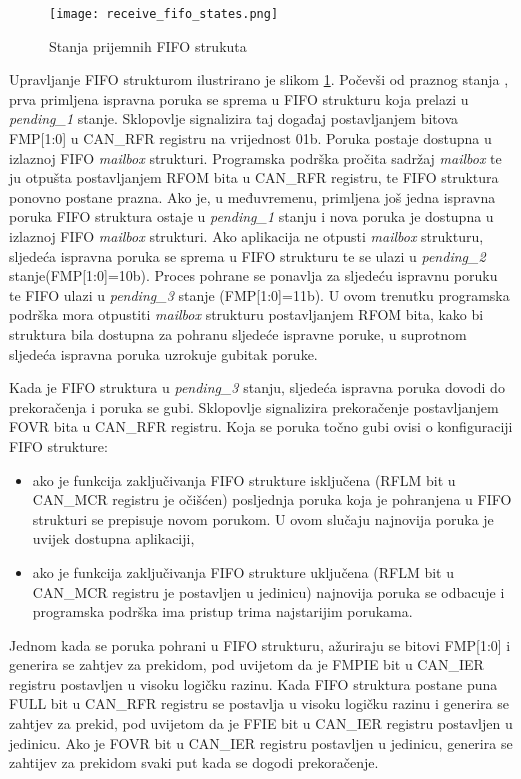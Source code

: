 \begin{figure}[H]
	\centering
	\texttt{[image: receive\_fifo\_states.png]}
	\caption{Stanja prijemnih FIFO strukuta \cite{l471_manual}}
	\label{fig:receive_fifo_states}
\end{figure}
Upravljanje FIFO strukturom ilustrirano je slikom \ref{fig:receive_fifo_states}. Počevši od praznog stanja , prva primljena ispravna poruka se sprema u FIFO strukturu koja prelazi u \textit{pending\_1} stanje. Sklopovlje signalizira taj događaj postavljanjem bitova FMP[1:0] u CAN\_RFR registru na vrijednost 01b. Poruka postaje dostupna u izlaznoj FIFO \textit{mailbox} strukturi. Programska podrška pročita sadržaj \textit{mailbox} te ju otpušta postavljanjem RFOM bita u CAN\_RFR registru, te FIFO struktura ponovno postane prazna. Ako je, u međuvremenu, primljena još jedna ispravna poruka FIFO struktura ostaje u \textit{pending\_1} stanju i nova poruka je dostupna u izlaznoj FIFO \textit{mailbox} strukturi. Ako aplikacija ne otpusti \textit{mailbox} strukturu, sljedeća ispravna poruka se sprema u FIFO strukturu te se ulazi u \textit{pending\_2} stanje(FMP[1:0]=10b). Proces pohrane se ponavlja za sljedeću ispravnu poruku te FIFO ulazi u \textit{pending\_3} stanje (FMP[1:0]=11b). U ovom trenutku programska podrška mora otpustiti \textit{mailbox} strukturu postavljanjem RFOM bita, kako bi struktura bila dostupna za pohranu sljedeće ispravne poruke, u suprotnom sljedeća ispravna poruka uzrokuje gubitak poruke.

Kada je FIFO struktura u \textit{pending\_3} stanju, sljedeća ispravna poruka dovodi do prekoračenja i poruka se gubi. Sklopovlje signalizira prekoračenje postavljanjem FOVR bita u CAN\_RFR registru. Koja se poruka točno gubi ovisi o konfiguraciji FIFO strukture:
\begin{itemize}
	\item ako je funkcija zaključivanja FIFO strukture isključena (RFLM bit u CAN\_MCR registru je očišćen) posljednja poruka koja je pohranjena u FIFO strukturi se prepisuje novom porukom. U ovom slučaju najnovija poruka je uvijek dostupna aplikaciji,
	\item ako je funkcija zaključivanja FIFO strukture uključena (RFLM bit u CAN\_MCR registru je postavljen u jedinicu) najnovija poruka se odbacuje i programska podrška ima pristup trima najstarijim porukama.
\end{itemize}

Jednom kada se poruka pohrani u FIFO strukturu, ažuriraju se bitovi FMP[1:0] i generira se zahtjev za prekidom, pod uvijetom da je FMPIE bit u CAN\_IER registru postavljen u visoku logičku razinu. Kada FIFO struktura postane puna FULL bit u CAN\_RFR registru se postavlja u visoku logičku razinu i generira se zahtjev za prekid, pod uvijetom da je FFIE bit u CAN\_IER registru postavljen u jedinicu. Ako je FOVR bit u CAN\_IER registru postavljen u jedinicu, generira se zahtijev za prekidom svaki put kada se dogodi prekoračenje.

